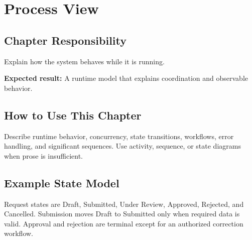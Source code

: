 \chapter{Process View}
\section{Chapter Responsibility}
\label{Section:ProcessViewResponsibility}
Explain how the system behaves while it is running.

\noindent\textbf{Expected result:} A runtime model that explains coordination and observable behavior.

\section{How to Use This Chapter}
Describe runtime behavior, concurrency, state transitions, workflows, error handling, and significant sequences. Use activity, sequence, or state diagrams when prose is insufficient.
\section{Example State Model}
Request states are Draft, Submitted, Under Review, Approved, Rejected, and Cancelled. Submission moves Draft to Submitted only when required data is valid. Approval and rejection are terminal except for an authorized correction workflow.
